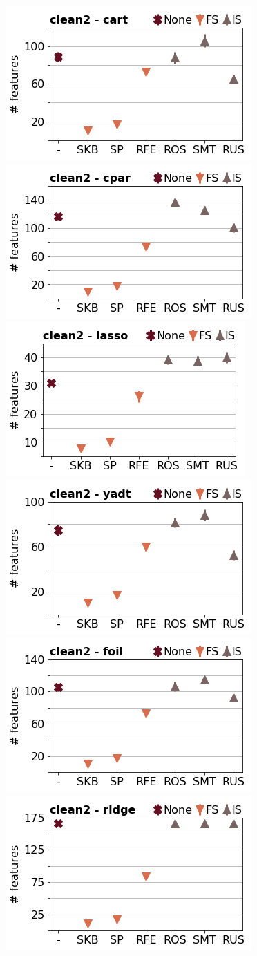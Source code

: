 \documentclass[runningheads,a4paper]{llncs}
\begin{document}
\begin{figure}[!h]
\includegraphics[width=0.32\linewidth]{fig/preps_clean2_DT_sklearn_nbr_features.png}
\includegraphics[width=0.32\linewidth]{fig/preps_clean2_RB_cpar_nbr_features.png}
\includegraphics[width=0.32\linewidth]{fig/preps_clean2_LM_lasso_nbr_features.png}
\includegraphics[width=0.32\linewidth]{fig/preps_clean2_DT_yadt_nbr_features.png}
\includegraphics[width=0.32\linewidth]{fig/preps_clean2_RB_foil_nbr_features.png}
\includegraphics[width=0.32\linewidth]{fig/preps_clean2_LM_ridge_nbr_features.png}
\end{figure}
\end{document}

